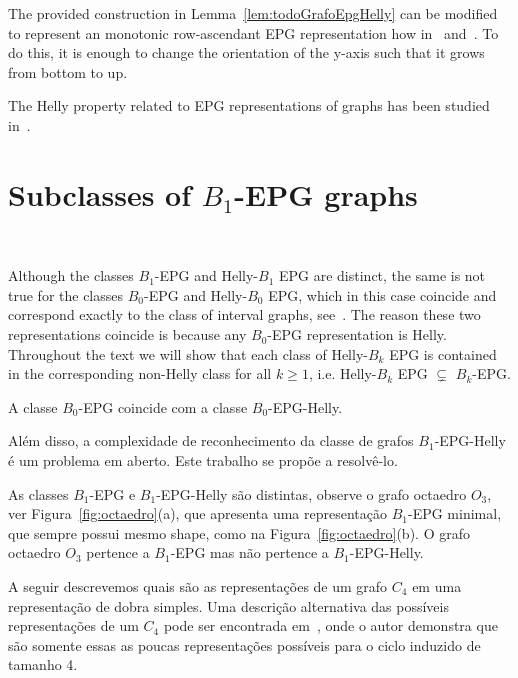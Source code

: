  


 The provided construction in Lemma~\ref{lem:todoGrafoEpgHelly} can be modified to represent an monotonic row-ascendant EPG representation how in~\cite{golumbic2009} and~\cite{golumbic2013}. To do this, it is enough to change the orientation of the y-axis such that it grows from bottom to up.


 
  The Helly property related to EPG representations of graphs has been studied in~\citet{golumbic2009,golumbic2013}.


\section{Subclasses of $B_1$-EPG graphs}\

Although the classes $ B_1$-EPG and Helly-$B_1$ EPG are distinct, the same is not true for the classes $B_0$-EPG and Helly-$B_0 $ EPG, which in this case coincide and correspond exactly to the class of interval graphs, see~\citet{booth1976}.  The reason these two representations coincide is because any $B_0$-EPG representation is Helly. Throughout the text we will show that each class of Helly-$B_k$ EPG is contained in the corresponding non-Helly class for all $ k \geq 1$, i.e. Helly-$B_k$ EPG $ \subsetneq$ $B_k$-EPG.



\begin{corollary}
A classe $B_0$-EPG coincide com a classe $B_0$-EPG-Helly.
\end{corollary}

Além disso, a complexidade de reconhecimento da classe de grafos $ B_1$-EPG-Helly é um problema em aberto. Este trabalho se propõe a resolvê-lo.


As classes  $ B_1$-EPG e $ B_1$-EPG-Helly são distintas, observe o grafo octaedro $ O_3$, ver Figura~\ref{fig:octaedro}(a), que apresenta uma representação  $B_1$-EPG minimal, que sempre possui mesmo shape, como na Figura~\ref{fig:octaedro}(b). O grafo octaedro  $ O_3 $ pertence a $ B_1$-EPG mas não pertence a $B_1$-EPG-Helly.




A seguir descrevemos quais são as representações de um grafo $C_4$ em uma representação de dobra simples. Uma descrição alternativa das possíveis representações de um $C_4$ pode ser encontrada em~\cite{golumbic2009}, onde o autor demonstra que são somente essas as poucas representações possíveis para o ciclo induzido de tamanho 4.


